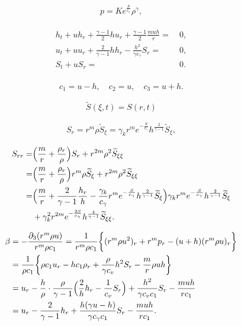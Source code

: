 \documentclass[10pt,a4paper]{amsart}
\newcommand{\fr}{\frac}
\begin{document}
\begin{align}\label{1.2}
p=Ke^{\frac{S}{c_v}}\rho^\gamma,
\end{align}

\begin{align}\label{2.1}
\begin{split}
h_t+uh_r+\fr{\gamma-1}{2}hu_r+\fr{\gamma-1}{2}\frac{m uh}{r}=&\ 0, \\
u_t+uu_r+\fr{2}{\gamma-1}hh_r-\fr{h^2}{\gamma c_\gamma}S_r=&\ 0, \\
S_t+uS_r=&\ 0.
\end{split}
\end{align}

\begin{align}\label{2.2}
c_1=u-h,\quad c_2=u, \quad c_3=u+h.
\end{align}

\begin{equation}
\label{st}
\widetilde{S}(\xi,t)=S(r,t)
\end{equation}

\begin{align}\label{2.7}
S_r=r^m\rho \widetilde{S}_\xi =\gamma_k r^m e^{-\fr{S}{c_\gamma}}h^{\fr{2}{\gamma-1}}\widetilde{S}_\xi,
\end{align}

\begin{align}\label{2.8}
S_{rr}=&\Big(\fr{m}{r}+\fr{\rho_r}{\rho}\Big)S_r+r^{2m}\rho^2 \widetilde{S}_{\xi\xi} \notag \\
=&\Big(\fr{m}{r}+\fr{\rho_r}{\rho}\Big)r^m\rho \widetilde{S}_\xi+r^{2m}\rho^2 \widetilde{S}_{\xi\xi} \notag \\
=& \Big(\fr{m}{r}+\fr{2}{\gamma-1}\fr{h_r}{h}-\fr{\gamma_k}{c_\gamma}r^{m}  e^{-\fr{S}{c_\gamma}}h^{\fr{2}{\gamma-1}}\widetilde{S}_\xi\Big)\gamma_k r^m e^{-\fr{S}{c_\gamma}}h^{\fr{2}{\gamma-1}}\widetilde{S}_\xi \notag \\
&+\gamma_{k}^2r^{2m}e^{-\fr{2S}{c_\gamma}}h^{\fr{4}{\gamma-1}} \widetilde{S}_{\xi\xi}.
\end{align}

\begin{align}\label{2.11}
\beta
&=-\frac{\partial_3(r^m\rho u)}{r^m\rho c_1}=
\fr{1}{r^m\rho c_1}\bigg\{(r^m\rho u^2)_r +r^mp_r-(u+h)(r^m\rho u)_r\bigg\}   \notag \\
&=\fr{1}{\rho c_1}\bigg\{\rho c_1u_r -hc_1\rho_r +\fr{\rho}{\gamma c_v}h^2S_r -\fr{m}{r}\rho uh\bigg\}   \notag \\
&=u_r -\fr{h}{\rho}\cdot \fr{\rho}{\gamma-1}\Big(\fr{2}{h}h_r-\fr{1}{c_v}S_r\Big)+\fr{h^2}{\gamma c_v c_1}S_r -\fr{m uh}{rc_1}   \notag \\
&=u_r -\fr{2}{\gamma-1}h_r +\fr{h(\gamma u-h)}{\gamma c_\gamma c_1}S_r-\fr{m uh}{rc_1}.
\end{align}
\end{document}
